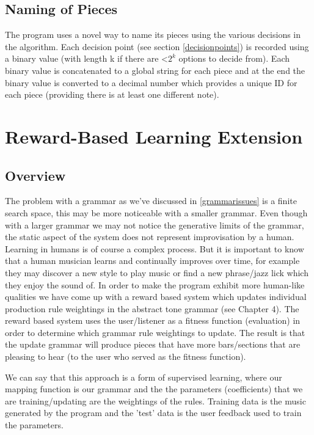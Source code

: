 \documentclass[pdftex,12pt,a4paper]{report}
\begin{document}
\section{Naming of Pieces} \label{naming}
The program uses a novel way to name its pieces using the various decisions in the algorithm. Each decision point (see section \ref{decisionpoints}) is recorded using a binary value (with length k if there are \textless $2^{k}$  options to decide from). Each binary value is concatenated to a global string for each piece and at the end the binary value is converted to a decimal number which provides a unique ID for each piece (providing there is at least one different note). 


\chapter{Reward-Based Learning Extension}

\section{Overview}
The problem with a grammar as we've discussed in \ref{grammarissues} is a finite search space, this may be more noticeable with a smaller grammar. Even though with a larger grammar we may not notice the generative limits of the grammar, the static aspect of the system does not represent improvisation by a human. Learning in humans is of course a complex process. But it is important to know that a human musician learns and continually improves over time, for example they may discover a new style to play music or find a new phrase/jazz lick which they enjoy the sound of. In order to make the program exhibit more human-like qualities we have come up with a reward based system which updates individual production rule weightings in the abstract tone grammar (see Chapter 4). The reward based system uses the user/listener as a fitness function (evaluation) in order to determine which grammar rule weightings to update. The result is that the update grammar will produce pieces that have more bars/sections that are pleasing to hear (to the user who served as the fitness function).

We can say that this approach is a form of supervised learning, where our mapping function is our grammar and the the parameters (coefficients) that we are training/updating are the weightings of the rules. Training data is the music generated by the program and the 'test' data is the user feedback used to train the parameters.
\end{document}
